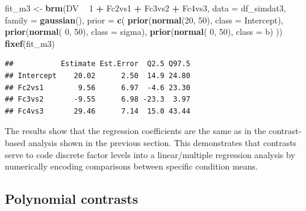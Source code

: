 \documentclass[12pt,]{krantz}
\newenvironment{Shaded}{\begin{snugshade}}{\end{snugshade}}
\newcommand{\DataTypeTok}[1]{\textcolor[rgb]{0.13,0.29,0.53}{#1}}
\newcommand{\DecValTok}[1]{\textcolor[rgb]{0.00,0.00,0.81}{#1}}
\newcommand{\KeywordTok}[1]{\textcolor[rgb]{0.13,0.29,0.53}{\textbf{#1}}}
\newcommand{\NormalTok}[1]{#1}
\newcommand{\OperatorTok}[1]{\textcolor[rgb]{0.81,0.36,0.00}{\textbf{#1}}}
\newcommand{\StringTok}[1]{\textcolor[rgb]{0.31,0.60,0.02}{#1}}
\theoremstyle{definition}
\theoremstyle{definition}
\theoremstyle{definition}
\theoremstyle{remark}
\begin{document}
\begin{Shaded}
\begin{Highlighting}[]
\NormalTok{fit_m3 <-}\StringTok{ }\KeywordTok{brm}\NormalTok{(DV }\OperatorTok{~}\StringTok{ }\DecValTok{1} \OperatorTok{+}\StringTok{ }\NormalTok{Fc2vs1 }\OperatorTok{+}\StringTok{ }\NormalTok{Fc3vs2 }\OperatorTok{+}\StringTok{ }\NormalTok{Fc4vs3,}
                 \DataTypeTok{data =}\NormalTok{ df_simdat3,}
                 \DataTypeTok{family =} \KeywordTok{gaussian}\NormalTok{(),}
                 \DataTypeTok{prior =} \KeywordTok{c}\NormalTok{(}
                     \KeywordTok{prior}\NormalTok{(}\KeywordTok{normal}\NormalTok{(}\DecValTok{20}\NormalTok{, }\DecValTok{50}\NormalTok{), }\DataTypeTok{class =}\NormalTok{ Intercept),}
                     \KeywordTok{prior}\NormalTok{(}\KeywordTok{normal}\NormalTok{( }\DecValTok{0}\NormalTok{, }\DecValTok{50}\NormalTok{), }\DataTypeTok{class =}\NormalTok{ sigma),}
                     \KeywordTok{prior}\NormalTok{(}\KeywordTok{normal}\NormalTok{( }\DecValTok{0}\NormalTok{, }\DecValTok{50}\NormalTok{), }\DataTypeTok{class =}\NormalTok{ b)}
\NormalTok{                 )) }
\KeywordTok{fixef}\NormalTok{(fit_m3)}
\end{Highlighting}
\end{Shaded}

\begin{verbatim}
##           Estimate Est.Error  Q2.5 Q97.5
## Intercept    20.02      2.50  14.9 24.80
## Fc2vs1        9.56      6.97  -4.6 23.30
## Fc3vs2       -9.55      6.98 -23.3  3.97
## Fc4vs3       29.46      7.14  15.0 43.44
\end{verbatim}

The results show that the regression coefficients are the same as in the contrast-based analysis shown in the previous section. This demonstrates that contrasts serve to code discrete factor levels into a linear/multiple regression analysis by numerically encoding comparisons between specific condition means.

\hypertarget{polynomialContrasts}{%
\subsection{Polynomial contrasts}\label{polynomialContrasts}}
\end{document}
